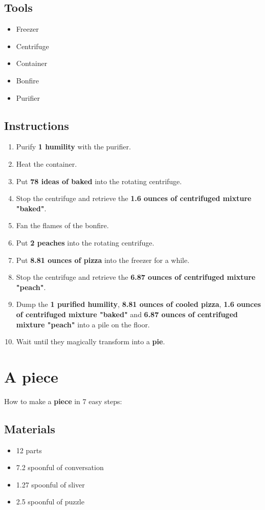 \documentclass{article}
\begin{document}
\subsection{Tools}\begin{itemize}
\item 
Freezer
\item 
Centrifuge
\item 
Container
\item 
Bonfire
\item 
Purifier
\end{itemize}
\subsection{Instructions}\begin{enumerate}
\item 
Purify \textbf{1 humility} with the purifier.
\item 
Heat the container.
\item 
Put \textbf{78 ideas of baked} into the rotating centrifuge.
\item 
Stop the centrifuge and retrieve the \textbf{1.6 ounces of centrifuged mixture "baked"}.
\item 
Fan the flames of the bonfire.
\item 
Put \textbf{2 peaches} into the rotating centrifuge.
\item 
Put \textbf{8.81 ounces of pizza} into the freezer for a while.
\item 
Stop the centrifuge and retrieve the \textbf{6.87 ounces of centrifuged mixture "peach"}.
\item 
Dump the \textbf{1 purified humility}, \textbf{8.81 ounces of cooled pizza}, \textbf{1.6 ounces of centrifuged mixture "baked"} and \textbf{6.87 ounces of centrifuged mixture "peach"} into a pile on the floor.
\item 
Wait until they magically transform into a \textbf{pie}.
\end{enumerate}
\newpage
\section{A piece}How to make a \textbf{piece} in 7 easy steps:

\subsection{Materials}\begin{itemize}
\item 
12 parts
\item 
7.2 spoonful of conversation
\item 
1.27 spoonful of sliver
\item 
2.5 spoonful of puzzle
\end{itemize}
\end{document}
